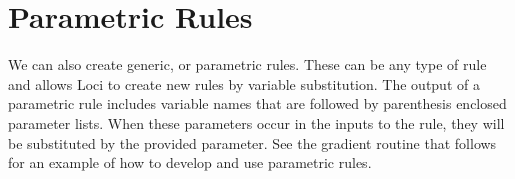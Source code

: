 \documentclass[10pt,epsf]{book}
\begin{document}


\section{Parametric Rules}

We can also create generic, or parametric rules.  These can be any
type of rule and allows Loci to create new rules by variable
substitution.  The output of a parametric rule includes variable names
that are followed by parenthesis enclosed parameter lists.  When these
parameters occur in the inputs to the rule, they will be substituted
by the provided parameter.  See the gradient routine that follows for
an example of how to develop and use parametric rules.



\end{document}
